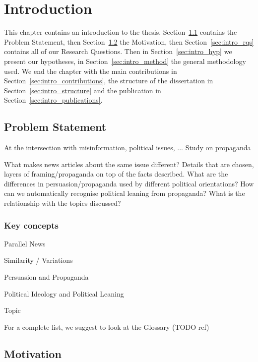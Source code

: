 \chapter{\statusorange Introduction}
\label{chap:intro}


This chapter contains an introduction to the thesis.
 Section~\ref{sec:intro_problem} contains the Problem Statement, then Section~\ref{sec:intro_motivation} the Motivation, then Section~\ref{sec:intro_rqs} contains all of our Research Questions. Then in Section~\ref{sec:intro_hyp} we present our hypotheses, in Section~\ref{sec:intro_method} the general methodology used. We end the chapter with the main contributions in Section~\ref{sec:intro_contributions}, the structure of the dissertation in Section~\ref{sec:intro_structure} and the publication in Section~\ref{sec:intro_publications}.


\section{Problem Statement}
\label{sec:intro_problem}


At the intersection with misinformation, political issues, ...
Study on propaganda

What makes news articles about the same issue different? Details that are chosen, layers of framing/propaganda on top of the facts described.
What are the differences in persuasion/propaganda used by different political orientations?
How can we automatically recognise political leaning from propaganda?
What is the relationship with the topics discussed?

\subsection{Key concepts}

Parallel News

Similarity / Variations

Persuasion and Propaganda

Political Ideology and Political Leaning

Topic

For a complete list, we suggest to look at the Glossary (TODO ref)



\section{Motivation}
\label{sec:intro_motivation}

